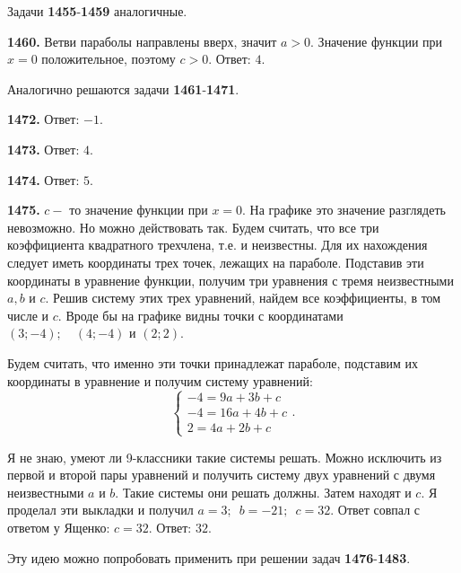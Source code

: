 Задачи \textbf{1455}-\textbf{1459} аналогичные.

\textbf{1460.} Ветви параболы направлены вверх, значит $a>0$. Значение функции при $x=0$ положительное, поэтому $c>0$. \newline \null \hspace*{\fill} Ответ: $4$. 

Аналогично решаются задачи  \textbf{1461}-\textbf{1471}.

\textbf{1472.} \newline \null \hspace*{\fill} Ответ: $-1$.

\textbf{1473.} \newline \null \hspace*{\fill} Ответ: $4$.

\textbf{1474.} \newline \null \hspace*{\fill} Ответ: $5$.

\textbf{1475.} $c-$ то значение функции при $x=0$. На графике это значение разглядеть невозможно. Но можно действовать так. Будем считать, что все три коэффициента квадратного трехчлена, т.е.   и  неизвестны. Для их нахождения следует иметь координаты  трех точек, лежащих на параболе. Подставив эти координаты в уравнение функции, получим три уравнения с тремя неизвестными $a,b$ и $c$. Решив систему этих трех уравнений, найдем все коэффициенты, в том числе и $c$. Вроде бы на графике видны точки с координатами $(3;-4);\quad (4;-4)$ и $(2;2)$.

Будем считать, что именно эти точки принадлежат параболе, подставим их координаты в уравнение и получим систему уравнений:$$
	\begin{cases}
		-4=9a+3b+c
		\\
		-4=16a+4b+c
		\\
		2=4a+2b+c
	\end{cases}
	.$$

Я не знаю, умеют ли 9-классники такие системы решать. Можно исключить 
из первой и второй пары уравнений и получить систему двух уравнений с двумя неизвестными $a$ и $b$. Такие системы они решать должны. Затем находят и $c$. Я проделал эти выкладки и получил $a=3;\enspace b=-21;\enspace c=32$.  Ответ совпал с ответом у Ященко: $c=32$. \newline \null \hspace*{\fill} Ответ: $32$.

Эту идею можно попробовать применить при решении задач  \textbf{1476}-\textbf{1483}.

